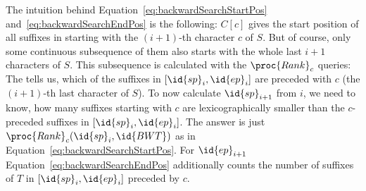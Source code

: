 The intuition behind Equation~\ref{eq:backwardSearchStartPos} and~\ref{eq:backwardSearchEndPos} is the following: $C[c]$ gives the start position of all suffixes in  starting with the $(i+1)$-th character $c$ of $S$. But of course, only some continuous subsequence of them also starts with the whole last $i+1$ characters of $S$. This subsequence is calculated with the $\proc{Rank}_c$ queries: The  tells us, which of the suffixes in $[\id{sp}_i,\id{ep}_i]$ are preceded with $c$ (the $(i+1)$-th last character of $S$). To now calculate $\id{sp}_{i+1}$ from $i$, we need to know, how many suffixes starting with $c$ are lexicographically smaller than the $c$-preceded suffixes in $[\id{sp}_i,\id{ep}_i]$. The answer is just $\proc{Rank}_c(\id{sp}_i, \id{BWT})$ as in Equation~\ref{eq:backwardSearchStartPos}. For $\id{ep}_{i+1}$ Equation~\ref{eq:backwardSearchEndPos} additionally counts the number of suffixes of $T$ in $[\id{sp}_i,\id{ep}_i]$ preceded by $c$.

